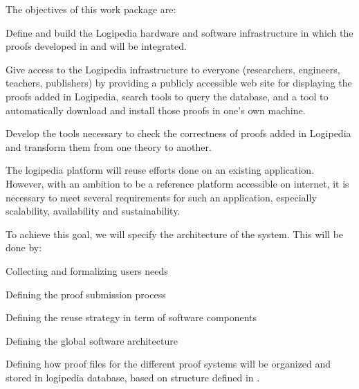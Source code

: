 \begin{workpackage}[id=access,wphases=0-48,type=MGT,
  short=Access,%
  title={Access to the infrastructure},
  lead=Irt,IrtRM=23,OcaRM=6,EduRM=12,InrRM=18]

\begin{wpobjectives}
  The objectives of this work package are:
  \begin{compactenum}[(a)]
  \item Define and build the Logipedia hardware and software
    infrastructure in which the proofs developed in
     and  will be
    integrated.
  \item Give access to the Logipedia infrastructure to everyone
    (researchers, engineers, teachers, publishers) by providing a
    publicly accessible web site for displaying the proofs added in
    Logipedia, search tools to query the database, and a tool to
    automatically download and install those proofs in one's own
    machine.
  \item Develop the tools necessary to check the correctness of proofs
    added in Logipedia and transform them from one theory to another.
  \end{compactenum}
\end{wpobjectives}

\begin{tasklist}

  \begin{task}[id=archi,
      title=Defining the functional and software architecture,
      lead=Irt,IrtRM=3]
    The logipedia platform will reuse efforts done on an existing
    application. However, with an ambition to be a reference platform
    accessible on internet, it is necessary to meet several
    requirements for such an application, especially scalability,
    availability and sustainability.

    To achieve this goal, we will specify the architecture of the system.
    This will be done by:
    \begin{compactitem}
    \item Collecting and formalizing users needs
    \item Defining the proof submission process
    \item Defining the reuse strategy in term of software components
    \item Defining the global software architecture
    \item Defining how proof files for the different proof systems
      will be organized and stored in logipedia database, based on
      structure defined in .
    \end{compactitem}


\end{task}
\end{tasklist}
\end{workpackage}
